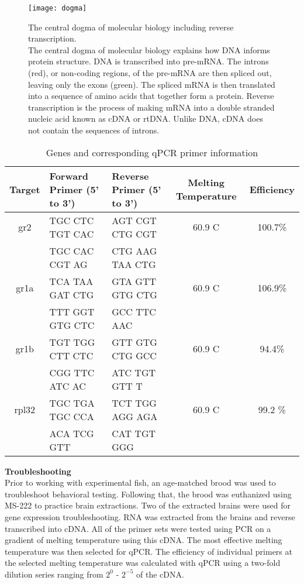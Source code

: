 \documentclass[12pt,twoside]{reedthesis}
\begin{document}
\begin{figure}[htbp] 
\begin{center} 
\texttt{[image: dogma]}
\caption[The central dogma of molecular biology including reverse transcription]{\footnotesize{The
    central dogma of molecular biology including reverse transcription. \\ The
    central dogma of molecular biology explains how DNA informs protein
    structure. DNA is transcribed into pre-mRNA. The introns (red), or non-coding
    regions, of the pre-mRNA are then spliced out, leaving only the exons
    (green). The spliced mRNA is then translated into a sequence of amino acids
    that together form a protein. Reverse transcription is the process of making
  mRNA into a double stranded nucleic acid known as cDNA or rtDNA. Unlike DNA, cDNA
  does not contain the sequences of introns.}} 
\label{subd}
\end{center} 
\end{figure}

\begin{table}[htbp]
\caption[Genes and corresponding qPCR primer information]{Genes and corresponding
 qPCR primer information}
\begin{center}
\footnotesize
\begin{tabular}{ | c | l | l | c | c |}
\hline
Target & Forward Primer (5' to 3')& Reverse Primer (5' to 3') & Melting Temperature & Efficiency\\
\hline
gr2 & TGC CTC TGT CAC & AGT CGT CTG CGT & 60.9 \textdegree{}C& 100.7\%\\
  &  TGC CAC CGT AG & CTG AAG TAA CTG & & \\
\hline
  gr1a & TCA TAA GAT CTG& GTA GTT GTG CTG & 60.9 \textdegree{}C& 106.9\% \\
  &  TTT GGT GTG CTC &  GCC TTC AAC & & \\
\hline
    gr1b & TGT TGG CTT CTC  & GTT GTG CTG GCC & 60.9 \textdegree{}C& 94.4\%\\
  & CGG TTC ATC AC & ATC TGT GTT T & & \\
\hline
    rpl32 & TGC TGA TGC CCA & TCT TGG AGG AGA & 60.9 \textdegree{}C& 99.2 \%\\
  & ACA TCG GTT & CAT TGT GGG & & \\
\hline
\end{tabular}
\end{center}
\end{table}

\noindent\textbf{Troubleshooting}\\
Prior to working with experimental fish, an age-matched brood was used to
troubleshoot behavioral testing. Following that, the brood was euthanized using
MS-222 to practice brain extractions. Two of the extracted brains were used for
gene expression troubleshooting. RNA was extracted from the brains and reverse
transcribed into cDNA. All of the primer sets were tested using PCR on a gradient of
melting temperature using this cDNA. The most effective melting temperature was
then selected for qPCR. The efficiency of individual primers at the selected
melting temperature was calculated with qPCR using a two-fold dilution series
ranging from $2^0$ - $2^{-5}$ of the cDNA.
\end{document}
